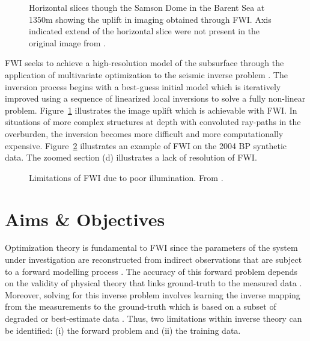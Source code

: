 \begin{figure}[!ht]
	\centering
	\caption[Horizontal slices though the Samson Dome.]{Horizontal slices though the Samson Dome in the Barent Sea at 1350m showing the uplift in imaging obtained through FWI. Axis indicated extend of the horizontal slice were not present in the original image from \cite{Morgan2013}.} 
	\label{fig:conventional_vs_fwi}
\end{figure}

FWI seeks to achieve a high-resolution model of the subsurface through the application of multivariate optimization to the seismic inverse problem \citep{Virieux2009}. The inversion process begins with a best-guess initial model which is iteratively improved using a sequence of linearized local inversions to solve a fully non-linear problem. Figure~\ref{fig:conventional_vs_fwi} illustrates the image uplift which is achievable with FWI. In situations of more complex structures at depth with convoluted ray-paths in the overburden, the inversion becomes more difficult and more computationally expensive. Figure~\ref{fig:limitations_fwi} illustrates an example of FWI on the 2004 BP synthetic data. The zoomed section (d) illustrates a lack of resolution of FWI.

\begin{figure}[!ht]
	\centering

	\caption[Limitations of FWI due to poor illumination.]{Limitations of FWI due to poor illumination. From \cite{Shin2010}.} 
	\label{fig:limitations_fwi}
\end{figure}

\section{Aims \& Objectives}
Optimization theory is fundamental to FWI since the parameters of the system under investigation are reconstructed from indirect observations that are subject to a forward modelling process \citep{Tarantola2005}. The accuracy of this forward problem depends on the validity of physical theory that links ground-truth to the measured data \citep{Innanen2014}. Moreover, solving for this inverse problem involves learning the inverse mapping from the measurements to the ground-truth which is based on a subset of degraded or best-estimate data \citep{Tarantola2005, Tikhonov1977}. Thus, two limitations within inverse theory can be identified: (i) the forward problem and (ii) the training data. 

